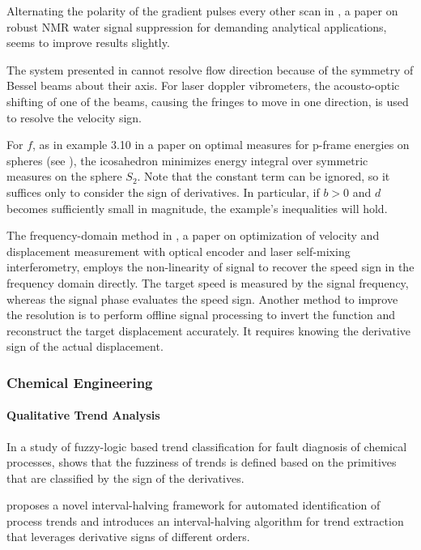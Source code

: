 \documentclass[11pt]{book}
\begin{document}
Alternating the polarity of the gradient pulses every other scan in
\cite{aguilar2016robust}, a paper on robust NMR water signal suppression for
demanding analytical applications, seems to improve results slightly.

The system presented in \cite{sakah2016measuring} cannot resolve
flow direction because of the symmetry of Bessel beams about their
axis. For laser doppler vibrometers, the acousto-optic shifting of one of the beams, causing
the fringes to move in one direction, is used to resolve the velocity
sign.

For $f$, as in example 3.10 in a paper on optimal measures for p-frame energies on spheres (see \cite{bilyk2019optimal}), the icosahedron
minimizes energy integral over symmetric measures on the sphere $S_{2}$.
Note that the constant term can be ignored, so it suffices only to
consider the sign of derivatives. In particular, if $b>0$ and $d$
becomes sufficiently small in magnitude, the example's inequalities
will hold.

The frequency-domain method in \cite{sun2020optimization}, a paper on optimization of velocity and displacement measurement with optical encoder
and laser self-mixing interferometry, employs
the non-linearity of signal to recover the speed sign in the frequency
domain directly. The target speed is measured by the signal frequency,
whereas the signal phase evaluates the speed sign. Another method
to improve the resolution is to perform offline signal processing
to invert the function and reconstruct the target displacement accurately.
It requires knowing the derivative sign of the actual displacement.


\subsubsection{Chemical Engineering}

\paragraph{Qualitative Trend Analysis}

In a study of fuzzy-logic
based trend classification for fault diagnosis of chemical processes, \cite{dash2003fuzzy} shows that the fuzziness of trends is defined based
on the primitives that are classified by the sign of the derivatives.

\cite{dash2004novel} proposes a novel interval-halving framework for automated identification of
process trends and introduces an interval-halving algorithm for
trend extraction that leverages derivative signs of different orders.
\end{document}
